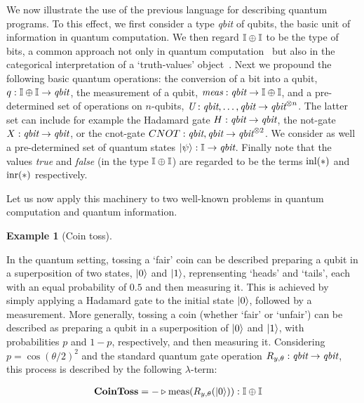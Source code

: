\documentclass[10pt,a4paper]{amsart}
\theoremstyle{definition}
\theoremstyle{definition}
\newtheorem{example}[definition]{Example}
\theoremstyle{definition}
\theoremstyle{definition}
\theoremstyle{definition}
\theoremstyle{definition}
\begin{document}
We now illustrate the use of the previous language for describing quantum
programs. To this effect, we first consider a type \emph{qbit} of qubits, the
basic unit of information in quantum computation. We then regard $\mathbb{I} \oplus
\mathbb{I}$ to be the type of bits, a common approach not only in quantum
computation~\cite{selinger04} but also in the categorical interpretation of a
`truth-values' object~\cite{johnstone02,cho15}. Next we propound the following
basic quantum operations:  the conversion of a bit into a qubit, $q : \mathbb{I}
\oplus \mathbb{I}  \to \emph{qbit}$, the measurement of a qubit,
$\emph{meas}:\emph{qbit} \to \mathbb{I} \oplus \mathbb{I}$, and a pre-determined set of
operations on $n$-qubits, $\emph{U}:\emph{qbit},\ldots,\emph{qbit} \to
\emph{qbit}^{\otimes n}$. The latter set can include for example the Hadamard
gate $H : \emph{qbit} \to \emph{qbit}$, the not-gate $X : \emph{qbit} \to
\emph{qbit}$, or the cnot-gate $CNOT : \emph{qbit},\emph{qbit} \to
\emph{qbit}^{\otimes 2}$. We consider as well a pre-determined set of quantum
states $\ket{\psi} : \mathbb{I} \to \emph{qbit}$.  Finally note that the values
\emph{true} and \emph{false} (in the type $\mathbb{I} \oplus \mathbb{I}$) are regarded to be 
the terms $\mathrm{inl}(\ast)$ and $\mathrm{inr}(\ast)$ respectively.

Let us now apply this machinery to two well-known problems in quantum computation
and quantum information.

\begin{example}[Coin toss]
~
\end{example}

In the quantum setting, tossing a `fair' coin can be described preparing a qubit in a superposition of two states, $\ket{0}$ and $\ket{1}$, reprensenting `heads' and `tails', each with an equal probability of $0.5$ and then measuring it. This is achieved by simply applying a Hadamard gate to the initial state $\ket{0}$, followed by a measurement.
More generally, tossing a coin (whether `fair' or `unfair') can be described as preparing a qubit in a superposition of  $\ket{0}$ and $\ket{1}$, with probabilities $p$ and $1-p$, respectively,  and then measuring it.  Considering $p= \cos(\theta/2)^2$ and the standard quantum gate operation $R_{y,\theta} : \emph{qbit} \to \emph{qbit}$,  this process is described by the following $\lambda$-term:

\begin{align*}
  &\textbf{CoinToss} = - \triangleright \text{meas} (R_{y,\theta} (\ket{0})): \mathbb{I} \oplus \mathbb{I}
\end{align*}
\end{document}
